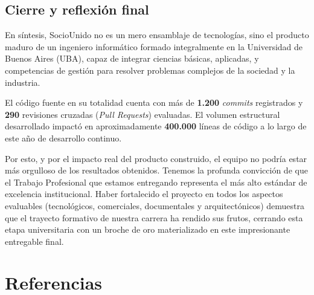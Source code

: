\documentclass[conference, a4paper]{IEEEtran}
\begin{document}
\subsection{Cierre y reflexi\'on final}
En s\'intesis, SocioUnido no es un mero ensamblaje de tecnolog\'ias, sino el producto maduro de un ingeniero inform\'atico formado integralmente en la Universidad de Buenos Aires (UBA), capaz de integrar ciencias b\'asicas, aplicadas, y competencias de gesti\'on para resolver problemas complejos de la sociedad y la industria.

El c\'odigo fuente en su totalidad cuenta con m\'as de \textbf{1.200} \textit{commits} registrados y \textbf{290} revisiones cruzadas (\textit{Pull Requests}) evaluadas. El volumen estructural desarrollado impact\'o en aproximadamente \textbf{400.000} l\'ineas de c\'odigo a lo largo de este a\~no de desarrollo continuo.

Por esto, y por el impacto real del producto construido, el equipo no podr\'ia estar m\'as orgulloso de los resultados obtenidos. Tenemos la profunda convicci\'on de que el Trabajo Profesional que estamos entregando representa el m\'as alto est\'andar de excelencia institucional. Haber fortalecido el proyecto en todos los aspectos evaluables (tecnol\'ogicos, comerciales, documentales y arquitect\'onicos) demuestra que el trayecto formativo de nuestra carrera ha rendido sus frutos, cerrando esta etapa universitaria con un broche de oro materializado en este impresionante entregable final.

\section{Referencias}
\end{document}
